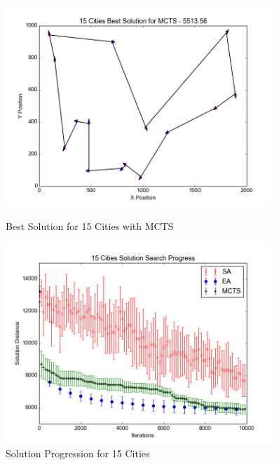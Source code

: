 \begin{figure}[H]
\begin{minipage}{0.45\textwidth}
        \includegraphics[width=0.9\textwidth]{15City_MCTS.png} %
        \caption{Best Solution for 15 Cities with MCTS}
        \label{fig:15city_MCTS}
    \end{minipage}\hfill
    \begin{minipage}{0.45\textwidth}
		\centering
		\includegraphics[width=0.9\textwidth]{15City_Solutions.png}
		\caption{Solution Progression for 15 Cities}
		\label{fig:15city_Solution}
    \end{minipage}\hfill
\end{figure}
